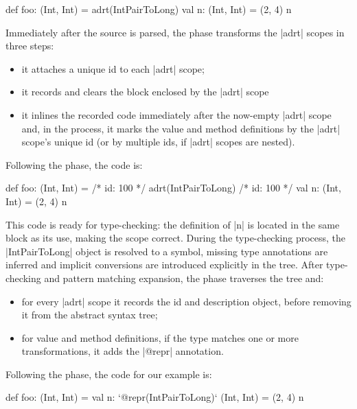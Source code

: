 \begin{lstlisting-nobreak}
def foo: (Int, Int) = {
  adrt(IntPairToLong) {
    val n: (Int, Int) = (2, 4)
  }
  n
}
\end{lstlisting-nobreak}

\noindent
Immediately after the source is parsed, the \postparser{} phase transforms the |adrt| scopes in three steps:
\begin{itemize}
\item it attaches a unique id to each |adrt| scope;
\item it records and clears the block enclosed by the |adrt| scope
\item it inlines the recorded code immediately after the now-empty
|adrt| scope and, in the process, it marks the value and method definitions
by the |adrt| scope's unique id (or by multiple ids, if |adrt| scopes are nested).
\end{itemize}
\noindent Following the \postparser{} phase, the code is:

\begin{lstlisting-nobreak}
def foo: (Int, Int) = {
  /* id: 100 */ adrt(IntPairToLong) {}
  /* id: 100 */ val n: (Int, Int) = (2, 4)
  n
}
\end{lstlisting-nobreak}

This code is ready for type-checking: the definition of |n| is located in the same block as its use, making the scope correct. During the type-checking process, the |IntPairToLong| object is resolved to a symbol, missing type annotations are inferred and implicit conversions are introduced explicitly in the tree. After type-checking and pattern matching expansion, the \inject{} phase traverses the tree and: %

\begin{itemize}
\item for every |adrt| scope it records the id and description object, before removing it from the abstract syntax tree;
\item for value and method definitions, if the type matches one or more transformations, it adds the |@repr| annotation.
\end{itemize}
\noindent Following the \inject{} phase, the code for our example is:

\begin{lstlisting-nobreak}
def foo: (Int, Int) = {
  val n: `@repr(IntPairToLong)` (Int, Int) = (2, 4)
  n
}
\end{lstlisting-nobreak}

